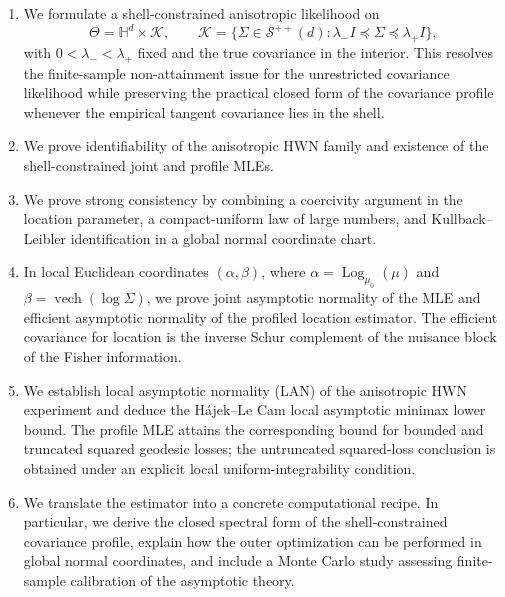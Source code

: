 \documentclass[11pt]{article}
\DeclareMathOperator{\vech}{vech}
\newcommand{\KLtext}{Kullback--Leibler\xspace}
\newcommand{\Hh}{\mathbb{H}}
\newcommand{\SPD}{\mathcal{S}^{++}}
\newcommand{\Id}{I}
\newcommand{\Log}{\operatorname{Log}}
\newcommand{\shell}{\mathcal{K}}
\newcommand{\HajekLecam}{H\'ajek--Le Cam\xspace}
\begin{document}
\begin{enumerate}
\item We formulate a shell-constrained anisotropic likelihood on
\[
\Theta=\Hh^d\times \shell,
\qquad
\shell=\{\Sigma\in\SPD(d):\lambda_-\Id\preceq\Sigma\preceq\lambda_+\Id\},
\]
with $0<\lambda_-<\lambda_+$ fixed and the true covariance in the interior. This resolves the finite-sample non-attainment issue for the unrestricted covariance likelihood while preserving the practical closed form of the covariance profile whenever the empirical tangent covariance lies in the shell.
\item We prove identifiability of the anisotropic HWN family and existence of the shell-constrained joint and profile MLEs.
\item We prove strong consistency by combining a coercivity argument in the location parameter, a compact-uniform law of large numbers, and \KLtext identification in a global normal coordinate chart.
\item In local Euclidean coordinates $(\alpha,\beta)$, where $\alpha=\Log_{\mu_0}(\mu)$ and $\beta=\vech(\log\Sigma)$, we prove joint asymptotic normality of the MLE and efficient asymptotic normality of the profiled location estimator. The efficient covariance for location is the inverse Schur complement of the nuisance block of the Fisher information.
\item We establish local asymptotic normality (LAN) of the anisotropic HWN experiment and deduce the \HajekLecam local asymptotic minimax lower bound. The profile MLE attains the corresponding bound for bounded and truncated squared geodesic losses; the untruncated squared-loss conclusion is obtained under an explicit local uniform-integrability condition.
\item We translate the estimator into a concrete computational recipe. In particular, we derive the closed spectral form of the shell-constrained covariance profile, explain how the outer optimization can be performed in global normal coordinates, and include a Monte Carlo study assessing finite-sample calibration of the asymptotic theory.
\end{enumerate}
\end{document}

